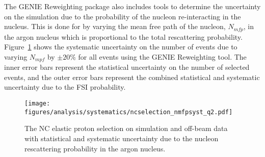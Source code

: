     The GENIE Reweighting package also includes tools to determine the
    uncertainty on the simulation due to the probability of the nucleon
    re-interacting in the nucleus. This is done for by varying the mean free
    path of the nucleon, $N_{mfp}$, in the argon nucleus which is proportional
    to the total rescattering probability. Figure~\ref{fig:systnmfp} shows the
    systematic uncertainty on the number of events due to varying $N_{mpf}$ by
    $\pm 20\%$ for all events using the GENIE Reweighting tool. The inner error
    bars represent the statistical uncertainty on the number of selected
    events, and the outer error bars represent the combined statistical and
    systematic uncertainty due to the FSI probability. 
    \begin{figure}[ht]
      \centering
      \texttt{[image: figures/analysis/systematics/ncselection\_nmfpsyst\_q2.pdf]}
      \caption{The NC elastic proton selection on simulation and off-beam data
      with statistical and systematic uncertainty due to the nucleon
      rescattering probability in the argon nucleus.}
      \label{fig:systnmfp}
    \end{figure}

